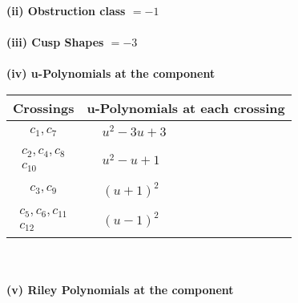\documentclass[1p]{elsarticle_modified}
\theoremstyle{definition}
\begin{document}
\flushleft \textbf{(ii) Obstruction class $= -1$}\\~\\
\flushleft \textbf{(iii) Cusp Shapes $= -3$}\\~\\
\newpage\renewcommand{\arraystretch}{1}
\flushleft \textbf{(iv) u-Polynomials at the component}\newline \\
\begin{tabular}{m{50pt}|m{274pt}}
Crossings & \hspace{64pt}u-Polynomials at each crossing \\
\hline $$\begin{aligned}c_{1},c_{7}\end{aligned}$$&$\begin{aligned}
&u^2-3 u+3
\end{aligned}$\\
\hline $$\begin{aligned}c_{2},c_{4},c_{8}\\c_{10}\end{aligned}$$&$\begin{aligned}
&u^2- u+1
\end{aligned}$\\
\hline $$\begin{aligned}c_{3},c_{9}\end{aligned}$$&$\begin{aligned}
&(u+1)^2
\end{aligned}$\\
\hline $$\begin{aligned}c_{5},c_{6},c_{11}\\c_{12}\end{aligned}$$&$\begin{aligned}
&(u-1)^2
\end{aligned}$\\
\hline
\end{tabular}\\~\\
\newpage\renewcommand{\arraystretch}{1}
\flushleft \textbf{(v) Riley Polynomials at the component}\newline \\
\end{document}
